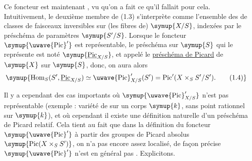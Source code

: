 Ce foncteur est maintenant , vu qu'on a fait ce qu'il
fallait pour cela. Intuitivement, le deuxième membre de (1.3) s'interprète
comme l'ensemble des  de classes de faisceaux
inversibles sur (les fibres de) $\symup{X/S}$, indexées par le préschéma de paramètres
$\symup{S'/S}$. Lorsque le foncteur $\symup{\mathop{\text{\uwave{Pic}}}\nolimits'}$ est représentable, le
préschéma sur $\symup{S}$ qui le représente est noté $\symup{\underline{\operatorname{Pic}}_{X/S}}$, et
appelé le \uline{préschéma de Picard} de $\symup{X}$ sur $\symup{S}$, donc, on aura alors
\begin{equation}
\symup{\operatorname{Hom}_S(S',\underline{\operatorname{Pic}}_{X/S})
\simeq\mathop{\text{\uwave{Pic}}}\nolimits'_{X/S}(S')
=\operatorname{Pic}'(X\times_S S'/S').
\tag{1.4}}
\end{equation}

Il y a cependant des cas importants où $\symup{\mathop{\text{\uwave{Pic}}}\nolimits'_{X/S}}$ n'est pas
représentable (exemple : variété de  sur un corps $\symup{k}$, sans
point rationnel sur $\symup{k}$), et où cependant il existe une définition naturelle
d'un préschéma de Picard relatif. Cela tient au fait que dans la définition du
foncteur $\symup{\mathop{\text{\uwave{Pic}}}\nolimits'}$ à partir des groupes de Picard absolus
$\symup{\operatorname{Pic}(X\times_S S')}$, on n'a pas encore assez localisé, de
façon précise $\symup{\mathop{\text{\uwave{Pic}}}\nolimits'}$ n'est en général pas . Explicitons.

